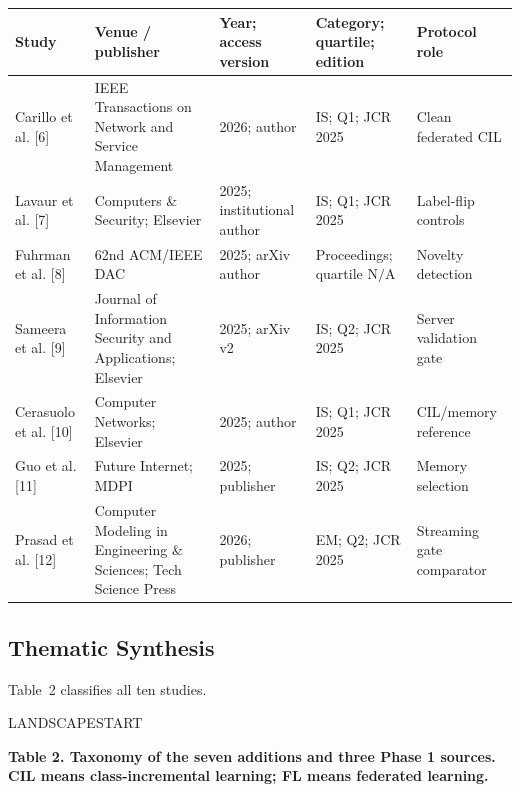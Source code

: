 \documentclass[10pt,a4paper]{article}
\newcommand{\NA}{\mathrm{N/A}}
\begin{document}
\begin{longtable}{p{2.5cm}l p{2.1cm}p{1.9cm}p{2.0cm}}
\toprule
Study & Venue / publisher & Year; access version & Category; quartile; edition & Protocol role\\
\midrule
Carillo et al. [6] & IEEE Transactions on Network and Service Management & 2026; author & IS; Q1; JCR 2025 & Clean federated CIL\\
Lavaur et al. [7] & Computers \& Security; Elsevier & 2025; institutional author & IS; Q1; JCR 2025 & Label-flip controls\\
Fuhrman et al. [8] & 62nd ACM/IEEE DAC & 2025; arXiv author & Proceedings; quartile $\NA$ & Novelty detection\\
Sameera et al. [9] & Journal of Information Security and Applications; Elsevier & 2025; arXiv v2 & IS; Q2; JCR 2025 & Server validation gate\\
Cerasuolo et al. [10] & Computer Networks; Elsevier & 2025; author & IS; Q1; JCR 2025 & CIL/memory reference\\
Guo et al. [11] & Future Internet; MDPI & 2025; publisher & IS; Q2; JCR 2025 & Memory selection\\
Prasad et al. [12] & Computer Modeling in Engineering \& Sciences; Tech Science Press & 2026; publisher & EM; Q2; JCR 2025 & Streaming gate comparator\\
\bottomrule
\end{longtable}


\subsection{Thematic Synthesis}
Table~2 classifies all ten studies.


\par LANDSCAPESTART



\centering\footnotesize
\par\textbf{Table 2. Taxonomy of the seven additions and three Phase 1 sources. CIL means class-incremental learning; FL means federated learning.}\par
\end{document}
